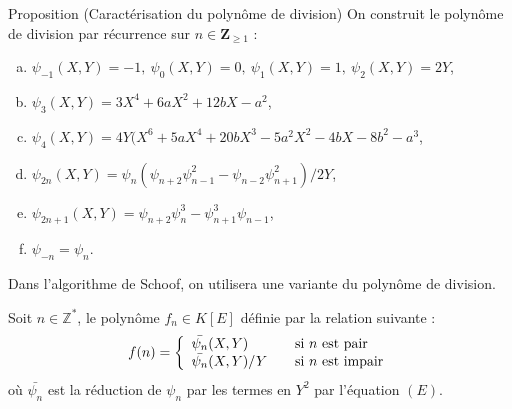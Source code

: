 \documentclass[french, lmodern]{beamer}
\begin{document}
\begin{frame}
\transwipe
\begin{block}{Proposition (Caractérisation du polynôme de division)}
On construit le polynôme de division par récurrence sur $n\in\mathbf{Z}_{\geq 1}$ :
\begin{enumerate}[a)]
\item $\psi_{-1}(X,Y)=-1,\ \psi_{0}(X,Y)=0,\ \psi_{1}(X,Y)=1,\ \psi_{2}(X,Y)=2Y$,
\item $\psi_{3}(X,Y)=3X^{4} + 6aX^{2} + 12bX - a^{2}$,
\item $\psi_{4}(X,Y)=4Y(X^{6} + 5aX^{4} + 20bX^{3} - 5a^{2}X^{2} - 4bX - 8b^{2} - a^{3}$,
\item $\psi_{2n}(X,Y)=\psi_{n}(\psi_{n+2}\psi_{n-1}^{2} - \psi_{n-2}\psi_{n+1}^{2})/2Y$,
\item $\psi_{2n+1}(X,Y)=\psi_{n+2}\psi_{n}^{3} - \psi_{n+1}^{3}\psi_{n-1}$,
\item $\psi_{-n}=\psi_{n}$.
\end{enumerate}
\end{block}
\end{frame}

\begin{frame}
\transwipe
Dans l'algorithme de Schoof, on utilisera une variante du polynôme de division.
\begin{definition}
Soit $n\in\mathbb{Z}^{*}$, le polynôme $f_{n}\in K[E]$ définie par la relation suivante : 
$$
f(n) = \left\{
\begin{array}{l l}
  \bar{\psi_{n}}(X,Y) & \quad \text{si } n \text{ est pair}\\
  \bar{\psi_{n}}(X,Y)/Y & \quad \text{si } n \text{ est impair}\\ \end{array} \right.
$$
où $\bar{\psi_{n}}$ est la réduction de $\psi_{n}$ par les termes en $Y^{2}$ par l'équation $(E)$.
\end{definition}
\end{frame}
\end{document}
